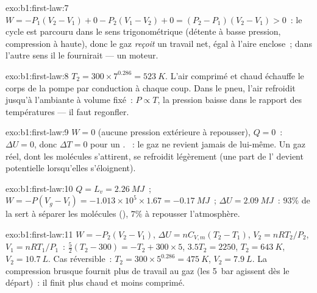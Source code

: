 \begin{solution}{exo:b1:first-law:7}
$W = -P_1(V_2 - V_1) + 0 - P_2(V_1 - V_2) + 0 = (P_2 - P_1)(V_2 - V_1) > 0$~:
le cycle est parcouru dans le sens trigonométrique (détente à basse
pression, compression à haute), donc le gaz \emph{reçoit} un travail net,
égal à l'aire enclose~; dans l'autre sens il le fournirait --- un moteur.
\end{solution}

\begin{solution}{exo:b1:first-law:8}
$T_2 = 300 \times 7^{0.286} = \qty{523}{K}$. L'air comprimé et chaud échauffe
le corps de la pompe par conduction à chaque coup. Dans le pneu, l'air
refroidit jusqu'à l'ambiante à volume fixé~: $P \propto T$, la pression
baisse dans le rapport des températures --- il faut regonfler.
\end{solution}

\begin{solution}{exo:b1:first-law:9}
$W = 0$ (aucune pression extérieure à repousser), $Q = 0$~: $\Delta U = 0$,
donc $\Delta T = 0$ pour un . ~: le gaz
ne revient jamais de lui-même. Un gaz réel, dont les molécules s'attirent,
se refroidit légèrement (une part de l' devient potentielle
lorsqu'elles s'éloignent).
\end{solution}

\begin{solution}{exo:b1:first-law:10}
$Q = L_v = \qty{2.26}{MJ}$~; $W = -P(V_g - V_l) = -1.013\times10^5 \times 1.67 =
\qty{-0.17}{MJ}$~; $\Delta U = \qty{2.09}{MJ}$~: $93\%$ de la  sert à
séparer les molécules (), $7\%$ à repousser l'atmosphère.
\end{solution}

\begin{solution}{exo:b1:first-law:11}
$W = -P_2(V_2 - V_1)$, $\Delta U = nC_{V,m}(T_2 - T_1)$, $V_2 = nRT_2/P_2$, $V_1
= nRT_1/P_1$~: $\tfrac52(T_2 - 300) = -T_2 + 300 \times 5$, $3.5T_2 = 2250$,
$T_2 = \qty{643}{K}$, $V_2 = \qty{10.7}{L}$. Cas réversible~: $T_2 = 300 \times
5^{0.286} = \qty{475}{K}$, $V_2 = \qty{7.9}{L}$. La compression brusque
fournit plus de travail au gaz (les \qty{5}{bar} agissent dès le départ)~: il
finit plus chaud et moins comprimé.
\end{solution}

